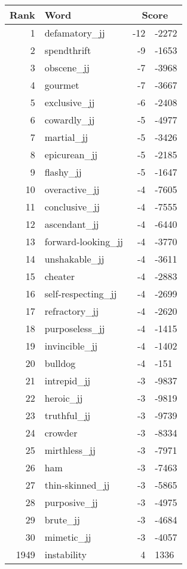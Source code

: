 \begin{longtable}[!htbp]{| rlr@{.}l |}
    \hline
    \textbf{Rank} & \textbf{Word} & \multicolumn{2}{c|}{\textbf{Score}} \\
    \hline
    \endhead
    1 & defamatory\_jj & -12 & -2272 \\
    2 & spendthrift & -9 & -1653 \\
    3 & obscene\_jj & -7 & -3968 \\
    4 & gourmet & -7 & -3667 \\
    5 & exclusive\_jj & -6 & -2408 \\
    6 & cowardly\_jj & -5 & -4977 \\
    7 & martial\_jj & -5 & -3426 \\
    8 & epicurean\_jj & -5 & -2185 \\
    9 & flashy\_jj & -5 & -1647 \\
    10 & overactive\_jj & -4 & -7605 \\
    11 & conclusive\_jj & -4 & -7555 \\
    12 & ascendant\_jj & -4 & -6440 \\
    13 & forward-looking\_jj & -4 & -3770 \\
    14 & unshakable\_jj & -4 & -3611 \\
    15 & cheater & -4 & -2883 \\
    16 & self-respecting\_jj & -4 & -2699 \\
    17 & refractory\_jj & -4 & -2620 \\
    18 & purposeless\_jj & -4 & -1415 \\
    19 & invincible\_jj & -4 & -1402 \\
    20 & bulldog & -4 & -151 \\
    21 & intrepid\_jj & -3 & -9837 \\
    22 & heroic\_jj & -3 & -9819 \\
    23 & truthful\_jj & -3 & -9739 \\
    24 & crowder & -3 & -8334 \\
    25 & mirthless\_jj & -3 & -7971 \\
    26 & ham & -3 & -7463 \\
    27 & thin-skinned\_jj & -3 & -5865 \\
    28 & purposive\_jj & -3 & -4975 \\
    29 & brute\_jj & -3 & -4684 \\
    30 & mimetic\_jj & -3 & -4057 \\
    1949 & instability & 4 & 1336 \\

\end{longtable}
